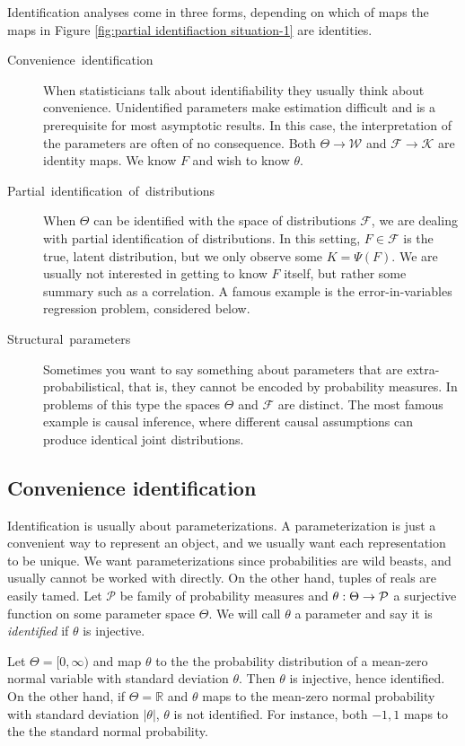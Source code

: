 Identification analyses come in three forms, depending on which of maps the maps in Figure \ref{fig:partial identifiaction situation-1} are identities. 
\begin{description}
\item [{Convenience~identification}] When statisticians talk about identifiability they usually think about convenience. Unidentified parameters make estimation difficult and is a prerequisite for most asymptotic results. In this case, the interpretation of the parameters are often of no consequence. Both $\Theta\to\mathcal{W}$ and $\mathcal{F}\to\mathcal{K}$ are identity maps. We know $F$ and wish to know $\theta$. 
\item [{Partial~identification~of~distributions}] When $\Theta$ can be identified with the space of distributions $\mathcal{F}$, we are dealing with partial identification of distributions. In this setting, $F\in\mathcal{F}$ is the true, latent distribution, but we only observe some $K=\Psi(F)$. We are usually not interested in getting to know $F$ itself, but rather some summary such as a correlation. A famous example is the error-in-variables regression problem, considered below.
\item [{Structural~parameters}] Sometimes you want to say something about parameters that are extra-probabilistical, that is, they cannot be encoded by probability measures. In problems of this type the spaces $\Theta$ and $\mathcal{F}$ are distinct. The most famous example is causal inference, where different causal assumptions can produce identical joint distributions. 
\end{description}

\subsection{Convenience identification}

Identification is usually about parameterizations. A parameterization is just a convenient way to represent an object, and we usually want each representation to be unique. We want parameterizations since probabilities are wild beasts, and usually cannot be worked with directly. On the other hand, tuples of reals are easily tamed. Let $\mathcal{P}$ be family of probability measures and $\theta:\text{\ensuremath{\Theta\to\mathcal{P}}}$ a surjective function on some parameter space $\Theta$. We will call $\theta$ a parameter and say it is\emph{ identified }if $\theta$ is injective. 
\begin{example}
\label{exa:normal unidentified}Let $\Theta=[0,\infty)$ and map $\theta$ to the the probability distribution of a mean-zero normal variable with standard deviation $\theta$. Then $\theta$ is injective, hence identified. On the other hand, if $\Theta=\mathbb{R}$ and $\theta$ maps to the mean-zero normal probability with standard deviation $|\theta|$, $\theta$ is not identified. For instance, both $-1,1$ maps to the the standard normal probability.
\end{example}


